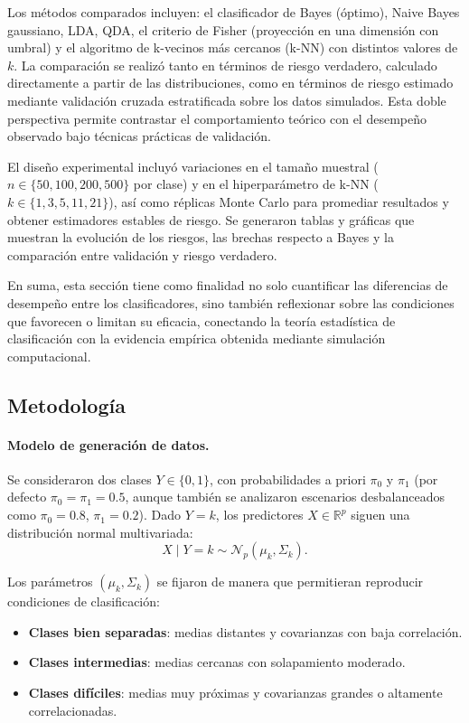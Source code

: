 \documentclass[10pt]{article}
\begin{document}
Los métodos comparados incluyen: el clasificador de Bayes (óptimo), Naive Bayes gaussiano, LDA, QDA, el criterio de Fisher (proyección en una dimensión con umbral) y el algoritmo de k-vecinos más cercanos (k-NN) con distintos valores de $k$. La comparación se realizó tanto en términos de riesgo verdadero, calculado directamente a partir de las distribuciones, como en términos de riesgo estimado mediante validación cruzada estratificada sobre los datos simulados. Esta doble perspectiva permite contrastar el comportamiento teórico con el desempeño observado bajo técnicas prácticas de validación.

El diseño experimental incluyó variaciones en el tamaño muestral ($n \in \{50, 100, 200, 500\}$ por clase) y en el hiperparámetro de k-NN ($k \in \{1, 3, 5, 11, 21\}$), así como réplicas Monte Carlo para promediar resultados y obtener estimadores estables de riesgo. Se generaron tablas y gráficas que muestran la evolución de los riesgos, las brechas respecto a Bayes y la comparación entre validación y riesgo verdadero. 

En suma, esta sección tiene como finalidad no solo cuantificar las diferencias de desempeño entre los clasificadores, sino también reflexionar sobre las condiciones que favorecen o limitan su eficacia, conectando la teoría estadística de clasificación con la evidencia empírica obtenida mediante simulación computacional.

\subsection*{Metodología}
\paragraph{Modelo de generación de datos.}
Se consideraron dos clases $Y \in \{0,1\}$, con probabilidades a priori $\pi_0$ y $\pi_1$ (por defecto $\pi_0=\pi_1=0.5$, aunque también se analizaron escenarios desbalanceados como $\pi_0=0.8$, $\pi_1=0.2$).  
Dado $Y=k$, los predictores $X \in \mathbb{R}^p$ siguen una distribución normal multivariada:
\[
X \mid Y=k \sim \mathcal{N}_p(\mu_k, \Sigma_k).
\]

Los parámetros $(\mu_k, \Sigma_k)$ se fijaron de manera que permitieran reproducir condiciones de clasificación:
\begin{itemize}
    \item \textbf{Clases bien separadas}: medias distantes y covarianzas con baja correlación.
    \item \textbf{Clases intermedias}: medias cercanas con solapamiento moderado.
    \item \textbf{Clases difíciles}: medias muy próximas y covarianzas grandes o altamente correlacionadas.
\end{itemize}
\end{document}
